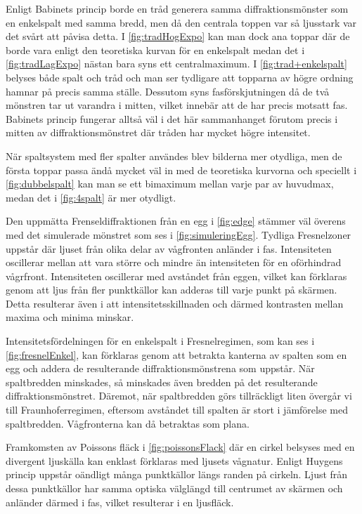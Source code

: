 \documentclass[a4paper]{article}
\begin{document}
  Enligt Babinets princip borde en tråd generera samma diffraktionsmönster som en enkelspalt med samma bredd, men då den centrala toppen var så ljusstark var det svårt att påvisa detta. I \autoref{fig:tradHogExpo} kan man dock ana toppar där de borde vara enligt den teoretiska kurvan för en enkelspalt medan det i \autoref{fig:tradLagExpo} nästan bara syns ett centralmaximum. I \autoref{fig:trad+enkelspalt} belyses både spalt och tråd och man ser tydligare att topparna av högre ordning hamnar på precis samma ställe. Dessutom syns fasförskjutningen då de två mönstren tar ut varandra i mitten, vilket innebär att de har precis motsatt fas. Babinets princip fungerar alltså väl i det här sammanhanget förutom precis i mitten av diffraktionsmönstret där tråden har mycket högre intensitet.
  
  När spaltsystem med fler spalter användes blev bilderna mer otydliga, men de första toppar passa ändå mycket väl in med de teoretiska kurvorna och speciellt i \autoref{fig:dubbelspalt} kan man se ett bimaximum mellan varje par av huvudmax, medan det i \autoref{fig:4spalt} är mer otydligt.
  
  Den uppmätta Frenseldiffraktionen från en egg i \autoref{fig:edge} stämmer väl överens med det simulerade mönstret som ses i \autoref{fig:simuleringEgg}. Tydliga Fresnelzoner uppstår där ljuset från olika delar av vågfronten anländer i fas. Intensiteten oscillerar mellan att vara större och mindre än intensiteten för en oförhindrad vågrfront. Intensiteten oscillerar med avståndet från eggen, vilket kan förklaras genom att ljus från fler punktkällor kan adderas till varje punkt på skärmen. Detta resulterar även i att intensitetsskillnaden och därmed kontrasten mellan maxima och minima minskar.

  Intensitetsfördelningen för en enkelspalt i Fresnelregimen, som kan ses i \autoref{fig:fresnelEnkel}, kan förklaras genom att betrakta kanterna av spalten som en egg och addera de resulterande diffraktionsmönstrena som uppstår. När spaltbredden minskades, så minskades även bredden på det resulterande diffraktionsmönstret. Däremot, när spaltbredden görs tillräckligt liten övergår vi till Fraunhoferregimen, eftersom avståndet till spalten är stort i jämförelse med spaltbredden. Vågfronterna kan då betraktas som plana.
 
  Framkomsten av Poissons fläck i \autoref{fig:poissonsFlack} där en cirkel belsyses med en divergent ljuskälla kan enklast förklaras med ljusets vågnatur. Enligt Huygens princip uppstår oändligt många punktkällor längs randen på cirkeln. Ljust från dessa punktkällor har samma optiska välglängd till centrumet av skärmen och anländer därmed i fas, vilket resulterar i en ljusfläck.
\end{document}
